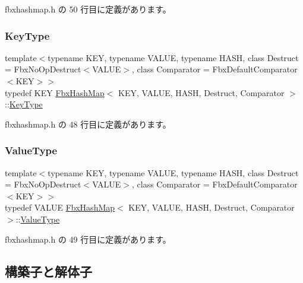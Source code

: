  fbxhashmap.\+h の 50 行目に定義があります。

\mbox{\label{class_fbx_hash_map_ab56799173b6c58b676a94370b64ddbb0}} 
\subsubsection{\texorpdfstring{Key\+Type}{KeyType}}
{\footnotesize\ttfamily template$<$typename K\+EY, typename V\+A\+L\+UE, typename H\+A\+SH, class Destruct = Fbx\+No\+Op\+Destruct$<$\+V\+A\+L\+U\+E$>$, class Comparator = Fbx\+Default\+Comparator$<$\+K\+E\+Y$>$$>$ \\
typedef K\+EY \hyperlink{class_fbx_hash_map}{Fbx\+Hash\+Map}$<$ K\+EY, V\+A\+L\+UE, H\+A\+SH, Destruct, Comparator $>$\+::\hyperlink{class_fbx_hash_map_ab56799173b6c58b676a94370b64ddbb0}{Key\+Type}}



 fbxhashmap.\+h の 48 行目に定義があります。

\mbox{\label{class_fbx_hash_map_a9c4cfd0138aa9233c119403f3cc85501}} 
\subsubsection{\texorpdfstring{Value\+Type}{ValueType}}
{\footnotesize\ttfamily template$<$typename K\+EY, typename V\+A\+L\+UE, typename H\+A\+SH, class Destruct = Fbx\+No\+Op\+Destruct$<$\+V\+A\+L\+U\+E$>$, class Comparator = Fbx\+Default\+Comparator$<$\+K\+E\+Y$>$$>$ \\
typedef V\+A\+L\+UE \hyperlink{class_fbx_hash_map}{Fbx\+Hash\+Map}$<$ K\+EY, V\+A\+L\+UE, H\+A\+SH, Destruct, Comparator $>$\+::\hyperlink{class_fbx_hash_map_a9c4cfd0138aa9233c119403f3cc85501}{Value\+Type}}



 fbxhashmap.\+h の 49 行目に定義があります。



\subsection{構築子と解体子}
\mbox{\label{class_fbx_hash_map_aa7eae049539759ac5dc0e058346da332}} 
